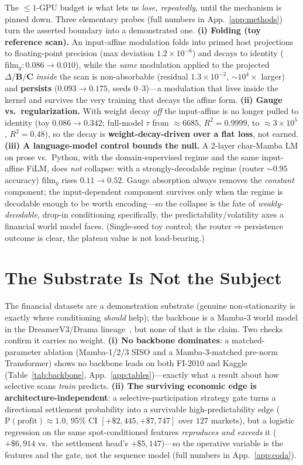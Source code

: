 \documentclass{article}
\begin{document}
The $\le1$-GPU budget is what lets us \emph{lose, repeatedly}, until the mechanism
is pinned down. Three elementary probes (full numbers in App.~\ref{app:methods})
turn the asserted boundary into a demonstrated one. \textbf{(i) Folding (toy
reference scan).} An input-affine modulation folds into primed host projections to
floating-point precision (max deviation $1.2\times10^{-6}$) and decays to identity
($\mathrm{film}_g: 0.086\!\to\!0.010$), while the \emph{same} modulation applied to
the projected $\Delta/\mathbf{B}/\mathbf{C}$ \emph{inside} the scan is
non-absorbable (residual $1.3\times10^{-2}$, $\sim10^4\times$ larger) and
\textbf{persists} ($0.093\!\to\!0.175$, seeds 0--3)---a modulation that lives inside
the kernel and survives the very training that decays the affine form.
\textbf{(ii) Gauge vs.\ regularization.} With weight decay \emph{off} the
input-affine is no longer pulled to identity (toy $0.086\!\to\!0.342$; full-model
$\tau$ from $\approx6685$, $R^2{=}0.9999$, to $\approx3\times10^5$, $R^2{=}0.48$),
so the decay is \textbf{weight-decay-driven over a flat loss}, not earned.
\textbf{(iii) A language-model control bounds the null.} A 2-layer char-Mamba LM on
prose vs.\ Python, with the domain-supervised regime and the same input-affine
FiLM, does \emph{not} collapse: with a strongly-decodable regime (router
${\sim}0.95$ accuracy) $\mathrm{film}_g$ rises $0.11\!\to\!0.52$. Gauge absorption
always removes the \emph{constant} component; the input-dependent component survives
only when the regime is decodable enough to be worth encoding---so the collapse is
the fate of \emph{weakly-decodable}, drop-in conditioning specifically, the
predictability/volatility axes a financial world model faces. (Single-seed toy
control; the router$\Rightarrow$persistence outcome is clear, the plateau value is
not load-bearing.)

\section{The Substrate Is Not the Subject}\label{sec:substrate}

The financial datasets are a demonstration substrate (genuine non-stationarity is
exactly where conditioning \emph{should} help); the backbone is a Mamba-3 world
model in the DreamerV3/Drama lineage~\citep{hafner2023dreamerv3, wang2024drama}, but
none of that is the claim. Two checks confirm it carries no weight. \textbf{(i) No backbone dominates}: a
matched-parameter ablation (Mamba-1/2/3 SISO and a Mamba-3-matched pre-norm
Transformer) shows no backbone leads on both FI-2010 and Kaggle
(Table~\ref{tab:backbone}, App.~\ref{app:tables})---exactly what a result about how
selective scans \emph{train} predicts. \textbf{(ii) The surviving economic edge is
architecture-independent}: a selective-participation strategy gate turns a
directional settlement probability into a survivable high-predictability edge
($\mathrm{P(profit)}\approx1.0$, 95\% CI $[+\$2{,}445,+\$7{,}747]$ over $127$
markets), but a logistic regression on the same spot-conditioned features
\emph{reproduces and exceeds} it ($+\$6{,}914$ vs.\ the settlement head's
$+\$5{,}147$)---so the operative variable is the features and the gate, not the
sequence model (full numbers in App.~\ref{app:coda}).
\end{document}
